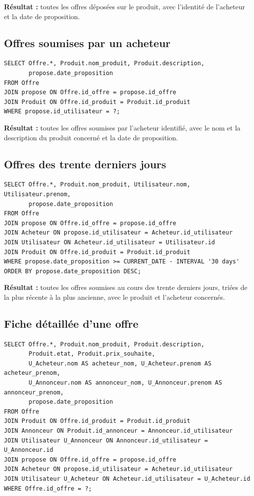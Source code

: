 \documentclass{article}
\theoremstyle{plain}
\theoremstyle{definition}
\begin{document}
\noindent\textbf{Résultat :} toutes les offres déposées sur le produit,
avec l'identité de l'acheteur et la date de proposition.
 
\subsection*{Offres soumises par un acheteur}
 
\begin{verbatim}
SELECT Offre.*, Produit.nom_produit, Produit.description,
       propose.date_proposition
FROM Offre
JOIN propose ON Offre.id_offre = propose.id_offre
JOIN Produit ON Offre.id_produit = Produit.id_produit
WHERE propose.id_utilisateur = ?;
\end{verbatim}
 
\noindent\textbf{Résultat :} toutes les offres soumises par l'acheteur
identifié, avec le nom et la description du produit concerné et la date
de proposition.
 
\subsection*{Offres des trente derniers jours}
 
\begin{verbatim}
SELECT Offre.*, Produit.nom_produit, Utilisateur.nom, Utilisateur.prenom,
       propose.date_proposition
FROM Offre
JOIN propose ON Offre.id_offre = propose.id_offre
JOIN Acheteur ON propose.id_utilisateur = Acheteur.id_utilisateur
JOIN Utilisateur ON Acheteur.id_utilisateur = Utilisateur.id
JOIN Produit ON Offre.id_produit = Produit.id_produit
WHERE propose.date_proposition >= CURRENT_DATE - INTERVAL '30 days'
ORDER BY propose.date_proposition DESC;
\end{verbatim}
 
\noindent\textbf{Résultat :} toutes les offres soumises au cours des
trente derniers jours, triées de la plus récente à la plus ancienne,
avec le produit et l'acheteur concernés.
 
\subsection*{Fiche détaillée d'une offre}
 
\begin{verbatim}
SELECT Offre.*, Produit.nom_produit, Produit.description,
       Produit.etat, Produit.prix_souhaite,
       U_Acheteur.nom AS acheteur_nom, U_Acheteur.prenom AS acheteur_prenom,
       U_Annonceur.nom AS annonceur_nom, U_Annonceur.prenom AS annonceur_prenom,
       propose.date_proposition
FROM Offre
JOIN Produit ON Offre.id_produit = Produit.id_produit
JOIN Annonceur ON Produit.id_annonceur = Annonceur.id_utilisateur
JOIN Utilisateur U_Annonceur ON Annonceur.id_utilisateur = U_Annonceur.id
JOIN propose ON Offre.id_offre = propose.id_offre
JOIN Acheteur ON propose.id_utilisateur = Acheteur.id_utilisateur
JOIN Utilisateur U_Acheteur ON Acheteur.id_utilisateur = U_Acheteur.id
WHERE Offre.id_offre = ?;
\end{verbatim}
 
\end{document}
